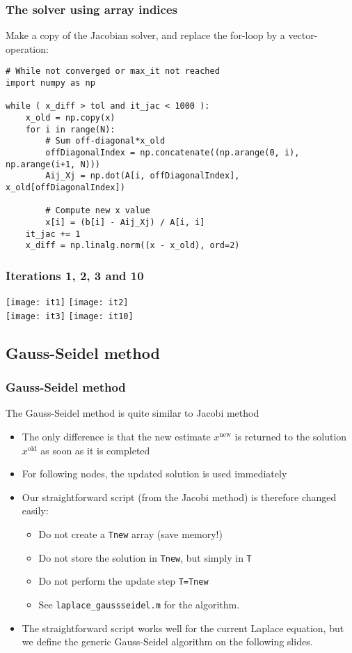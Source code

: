 \begin{frame}[fragile]
  \frametitle{The solver using array indices}
  Make a copy of the Jacobian solver, and replace the for-loop by a vector-operation:
  \begin{lstlisting}[basicstyle=\scriptsize\ttfamily]
# While not converged or max_it not reached
import numpy as np

while ( x_diff > tol and it_jac < 1000 ):
    x_old = np.copy(x)
    for i in range(N):
        # Sum off-diagonal*x_old
        offDiagonalIndex = np.concatenate((np.arange(0, i), np.arange(i+1, N)))
        Aij_Xj = np.dot(A[i, offDiagonalIndex], x_old[offDiagonalIndex])

        # Compute new x value
        x[i] = (b[i] - Aij_Xj) / A[i, i]
    it_jac += 1
    x_diff = np.linalg.norm((x - x_old), ord=2)
\end{lstlisting}
\end{frame}


\begin{frame}[fragile]
  \frametitle{Iterations 1, 2, 3 and 10}
  \texttt{[image: it1]} \hspace{0.5cm}
  \texttt{[image: it2]}\\
  \texttt{[image: it3]} \hspace{0.5cm} \texttt{[image: it10]}
\end{frame}

\subsection*{Gauss-Seidel method}
\begin{frame}[fragile]
  \frametitle{Gauss-Seidel method}
  The Gauss-Seidel method is quite similar to Jacobi method
  \begin{itemize}
   \item The only difference is that the new estimate $x^\text{new}$ is returned to the solution $x^\text{old}$ as soon as it is completed
   \item For following nodes, the updated solution is used immediately \pause
   \item Our straightforward script (from the Jacobi method) is therefore changed easily:
   \begin{itemize}
    \item Do not create a \lstinline$Tnew$ array (save memory!)
    \item Do not store the solution in \lstinline$Tnew$, but simply in \lstinline$T$
    \item Do not perform the update step \lstinline$T=Tnew$
    \item See \lstinline$laplace_gaussseidel.m$ for the algorithm.\pause
   \end{itemize}
   \item The straightforward script works well for the current Laplace equation, but we define the generic Gauss-Seidel algorithm on the following slides.
  \end{itemize}
\end{frame}

